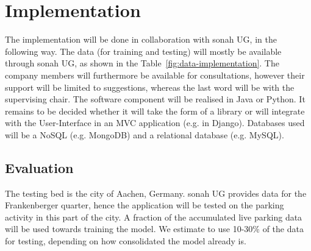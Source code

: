 \documentclass{article}
\begin{document}
 
\section{Implementation}
The implementation will be done in collaboration with sonah UG, in the following way. The data (for training and testing) will mostly be available through sonah UG, as shown in the Table~\ref{fig:data-implementation}. The company members will furthermore be available for consultations, however their support will be limited to suggestions, whereas the last word will be with the supervising chair. The software component will be realised in Java or Python. It remains to be decided whether it will take the form of a library or will integrate with the User-Interface in an MVC application (e.g. in Django). Databases used will be a NoSQL (e.g. MongoDB) and a relational database (e.g. MySQL).

\begin{table}[!ht]
	\caption{Data source and availability for implementation}
    \label{fig:data-implementation}
\end{table}

\subsection{Evaluation}
The testing bed is the city of Aachen, Germany. sonah UG provides data for the Frankenberger quarter, hence the application will be tested on the parking activity in this part of the city. A fraction of the accumulated live parking data will be used towards training the model. We estimate to use  10-30\% of the data for testing, depending on how consolidated the model already is.
\end{document}
